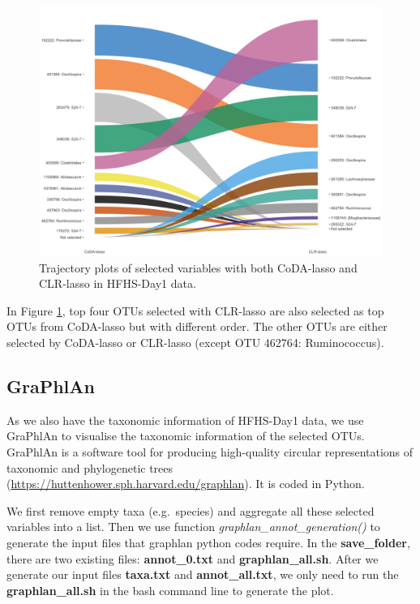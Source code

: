 \documentclass[openany]{book}
\begin{document}
\begin{figure}

{\centering \includegraphics[width=1\linewidth]{./Generated_plots/trajHFHS-1} 

}

\caption{Trajectory plots of selected variables with both CoDA-lasso and CLR-lasso in HFHS-Day1 data.}\label{fig:trajHFHS}
\end{figure}

In Figure \ref{fig:trajHFHS}, top four OTUs selected with CLR-lasso are
also selected as top OTUs from CoDA-lasso but with different order. The
other OTUs are either selected by CoDA-lasso or CLR-lasso (except OTU
462764: Ruminococcus).

\subsection{GraPhlAn}\label{graphlan}

As we also have the taxonomic information of HFHS-Day1 data, we use
GraPhlAn to visualise the taxonomic information of the selected OTUs.
GraPhlAn is a software tool for producing high-quality circular
representations of taxonomic and phylogenetic trees
(\url{https://huttenhower.sph.harvard.edu/graphlan}). It is coded in
Python.

We first remove empty taxa (e.g.~species) and aggregate all these
selected variables into a list. Then we use function
\emph{graphlan\_annot\_generation()} to generate the input files that
graphlan python codes require. In the \textbf{save\_folder}, there are
two existing files: \textbf{annot\_0.txt} and \textbf{graphlan\_all.sh}.
After we generate our input files \textbf{taxa.txt} and
\textbf{annot\_all.txt}, we only need to run the
\textbf{graphlan\_all.sh} in the bash command line to generate the plot.
\end{document}
